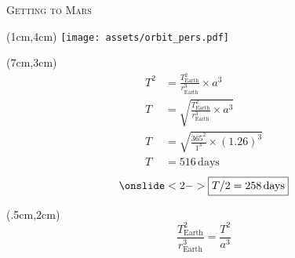 \documentclass[9pt]{beamer}
\begin{document}
    \begin{frame}{\textsc{Getting to Mars}}
        \begin{textblock*}{5cm}(1cm,4cm)
            \centering
            \texttt{[image: assets/orbit\_pers.pdf]}
        \end{textblock*}
        
        \begin{textblock*}{4cm}(7cm,3cm)
            \centering
            \begin{align*}
                T^2 &= \frac{T^2_{\text{Earth}}}{r^3_{\text{Earth}}}\times a^3\\
                T &= \sqrt{\frac{T^2_{\text{Earth}}}{r^3_{\text{Earth}}}\times a^3}\\
                T &= \sqrt{\frac{365^2}{1^3}\times (1.26)^3}\\
                T &= 516\,\text{days}
            \end{align*}
            \begin{align*}
                \onslide<2->{\boxed{T / 2 = 258\,\text{days}}}
            \end{align*}

        \end{textblock*}
        
        \begin{textblock*}{12cm}(.5cm,2cm)
        \begin{equation*}
            {\frac{T_{\text{Earth}}^2}{r_{\text{Earth}}^3} = \frac{T^2}{a^3}}
        \end{equation*}
        \end{textblock*}
    \end{frame}
\end{document}
